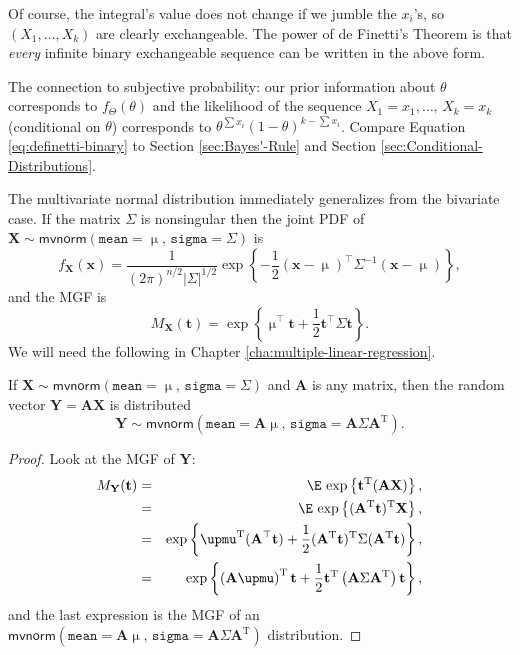 \documentclass[captions=tableheading]{scrbook}
\begin{document}
Of course, the integral's value does not change if we jumble the \(x_{i}\)'s, so \((X_{1},\ldots,X_{k})\) are clearly exchangeable. The power of de Finetti's Theorem is that \emph{every} infinite binary exchangeable sequence can be written in the above form.

The connection to subjective probability: our prior information about \(\theta\) corresponds to \(f_{\Theta}(\theta)\) and the likelihood of the sequence \(X_{1}=x_{1},\ldots,\, X_{k}=x_{k}\) (conditional on \(\theta\)) corresponds to \(\theta^{\sum x_{i}}(1-\theta)^{k-\sum x_{i}}\). Compare Equation \ref{eq:definetti-binary} to Section \ref{sec:Bayes'-Rule} and Section \ref{sec:Conditional-Distributions}.

The multivariate normal distribution immediately generalizes from the bivariate case. If the matrix \(\Sigma\) is nonsingular then the joint PDF of \(\mathbf{X}\sim\mathsf{mvnorm}(\mathtt{mean}=\upmu,\,\mathtt{sigma}=\Sigma)\) is
\begin{equation}
f_{\mathbf{X}}(\mathbf{x})=\frac{1}{(2\pi)^{n/2}\left|\Sigma\right|^{1/2}}\exp\left\{ -\frac{1}{2}\left(\mathbf{x}-\upmu\right)^{\top}\Sigma^{-1}\left(\mathbf{x}-\upmu\right)\right\},
\end{equation}
and the MGF is
\begin{equation}
M_{\mathbf{X}}(\mathbf{t})=\exp\left\{ \upmu^{\top}\mathbf{t}+\frac{1}{2}\mathbf{t}^{\top}\Sigma\mathbf{t}\right\}.
\end{equation}
We will need the following in Chapter \ref{cha:multiple-linear-regression}.
\begin{thm}
\label{thm:mvnorm-dist-matrix-prod}
If \(\mathbf{X}\sim\mathsf{mvnorm}(\mathtt{mean}=\upmu,\,\mathtt{sigma}=\Sigma)\) and \(\mathbf{A}\) is any matrix, then the random vector \(\mathbf{Y}=\mathbf{AX}\)
is distributed
\begin{equation}
\mathbf{Y}\sim\mathsf{mvnorm}(\mathtt{mean}=\mathbf{A}\upmu,\,\mathtt{sigma}=\mathbf{A}\Sigma\mathbf{A}^{\mathrm{T}}).
\end{equation}
\end{thm}

\begin{proof}
Look at the MGF of \(\mathbf{Y}\):
\begin{eqnarray*}
M_{\mathbf{Y}}(\mathbf{t}) & = & \E\,\exp\left\{ \mathbf{t}^{\mathrm{T}}(\mathbf{AX})\right\} ,\\
 & = & \E\,\exp\left\{ (\mathbf{A}^{\mathrm{T}}\mathbf{t})^{\mathrm{T}}\mathbf{X}\right\} ,\\
 & = & \exp\left\{ \upmu^{\mathrm{T}}(\mathbf{A}^{\top}\mathbf{t})+\frac{1}{2}(\mathbf{A}^{\mathrm{T}}\mathbf{t})^{\mathrm{T}}\Sigma(\mathbf{A}^{\mathrm{T}}\mathbf{t})\right\} ,\\
 & = & \exp\left\{ \left(\mathbf{A}\upmu\right)^{\mathrm{T}}\mathbf{t}+\frac{1}{2}\mathbf{t}^{\mathrm{T}}\left(\mathbf{A}\Sigma\mathbf{A}^{\mathrm{T}}\right)\mathbf{t}\right\},
\end{eqnarray*}
and the last expression is the MGF of an \(\mathsf{mvnorm}(\mathtt{mean}=\mathbf{A}\upmu,\,\mathtt{sigma}=\mathbf{A}\Sigma\mathbf{A}^{\mathrm{T}})\) distribution.
\end{proof}
\end{document}
